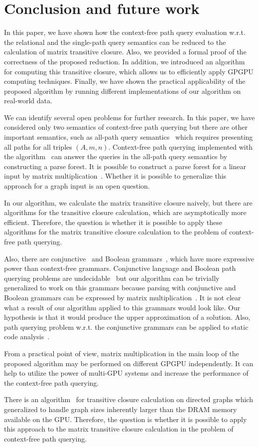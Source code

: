 \section{Conclusion and future work}
In this paper, we have shown how the context-free path query evaluation w.r.t. the relational and the single-path query semantics can be reduced to the calculation of matrix transitive closure. Also, we provided a formal proof of the correctness of the proposed reduction. In addition, we introduced an algorithm for computing this transitive closure, which allows us to efficiently apply GPGPU computing techniques. Finally, we have shown the practical applicability of the proposed algorithm by running different implementations of our algorithm on real-world data.

We can identify several open problems for further research. In this paper, we have considered only two semantics of context-free path querying but there are other important semantics, such as all-path query semantics~\cite{hellingsPathQuerying} which requires presenting all paths for all triples $(A,m,n)$. Context-free path querying implemented with the algorithm~\cite{GLL} can answer the queries in the all-path query semantics by constructing a parse forest. It is possible to construct a parse forest for a linear input by matrix multiplication~\cite{okhotin_cyk}. Whether it is possible to generalize this approach for a graph input is an open question.

In our algorithm, we calculate the matrix transitive closure naively, but there are algorithms for the transitive closure calculation, which are asymptotically more efficient. Therefore, the question is whether it is possible to apply these algorithms for the matrix transitive closure calculation to the problem of context-free path querying.

Also, there are conjunctive~\cite{okhotinConjAndBool} and Boolean grammars~\cite{okhotinBoolean}, which have more expressive power than context-free grammars. Conjunctive language and Boolean path querying problems are undecidable~\cite{hellingsRelational} but our algorithm can be trivially generalized to work on this grammars because parsing with conjunctive and Boolean grammars can be expressed by matrix multiplication~\cite{okhotin_cyk}. It is not clear what a result of our algorithm applied to this grammars would look like. Our hypothesis is that it would produce the upper approximation of a solution. Also, path querying problem w.r.t. the conjunctive grammars can be applied to static code analysis~\cite{zhang2017context}.

From a practical point of view, matrix multiplication in the main loop of the proposed algorithm may be performed on different GPGPU independently. It can help to utilize the power of multi-GPU systems and increase the performance of the context-free path querying.

There is an algorithm~\cite{apspGPU} for transitive closure calculation on directed graphs which generalized to handle graph sizes inherently larger than the DRAM memory available on the GPU. Therefore, the question is whether it is possible to apply this approach to the matrix transitive closure calculation in the problem of context-free path querying.
